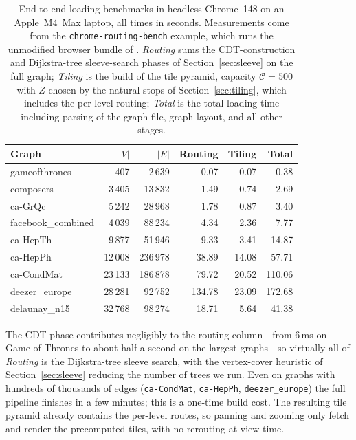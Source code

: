 \begin{table}[t]
  \centering
  \scriptsize
  \setlength{\tabcolsep}{6pt}
  \begin{tabular}{@{}lrrrrr@{}}
    \toprule
    Graph & $|V|$ & $|E|$ & Routing & Tiling & Total \\
    \midrule
    gameofthrones      &     407 &   2\,639 &   0.07 &   0.07 &   0.38 \\
    composers          &  3\,405 &  13\,832 &   1.49 &   0.74 &   2.69 \\
    ca-GrQc            &  5\,242 &  28\,968 &   1.78 &   0.87 &   3.40 \\
    facebook\_combined &  4\,039 &  88\,234 &   4.34 &   2.36 &   7.77 \\
    ca-HepTh           &  9\,877 &  51\,946 &   9.33 &   3.41 &  14.87 \\
    ca-HepPh           & 12\,008 & 236\,978 &  38.89 &  14.08 &  57.71 \\
    ca-CondMat         & 23\,133 & 186\,878 &  79.72 &  20.52 & 110.06 \\
    deezer\_europe     & 28\,281 &  92\,752 & 134.78 &  23.09 & 172.68 \\
    delaunay\_n15      & 32\,768 &  98\,274 &  18.71 &   5.64 &  41.38 \\
    \bottomrule
  \end{tabular}
  \caption{End-to-end loading benchmarks in headless Chrome~148 on an
    Apple~M4~Max laptop, all times in seconds. Measurements come from
    the \texttt{chrome-routing-bench} example, which runs the
    unmodified browser bundle of \msagljs{}. \emph{Routing} sums the
    CDT-construction and Dijkstra-tree sleeve-search phases of
    Section~\ref{sec:sleeve} on the full graph; \emph{Tiling} is the
    build of the tile pyramid, capacity $\mathcal{C}=500$ with $Z$
    chosen by the natural stops of Section~\ref{sec:tiling}, which
    includes the per-level routing; \emph{Total} is the total
    loading time including parsing of the graph file, graph layout,
    and all other stages.}
  \label{tab:perf}
\end{table}

The CDT phase contributes negligibly to the routing column---from 6\,ms on Game of Thrones to about half a second on the largest graphs---so virtually all of \emph{Routing} is the Dijkstra-tree sleeve search, with the vertex-cover heuristic of Section~\ref{sec:sleeve} reducing the number of trees we run. Even on graphs with hundreds of thousands of edges (\texttt{ca-CondMat}, \texttt{ca-HepPh}, \texttt{deezer\_europe}) the full pipeline finishes in a few minutes; this is a one-time build cost. The resulting tile pyramid already contains the per-level routes, so panning and zooming only fetch and render the precomputed tiles, with no rerouting at view time.

